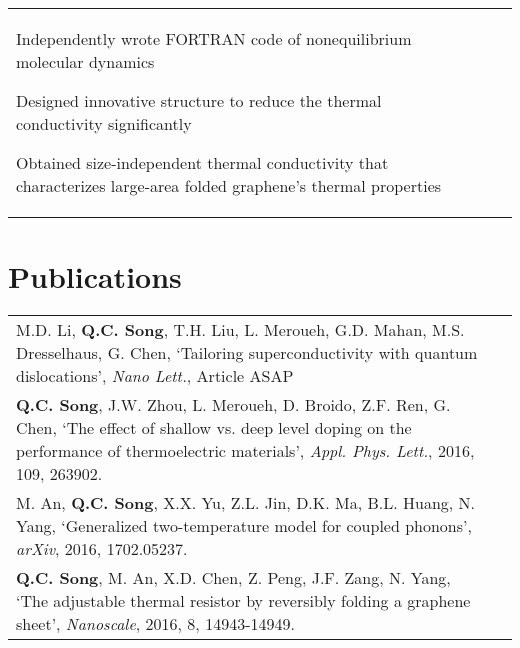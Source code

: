 \documentclass[a4paper,10pt]{article}
\begin{document}
\begin{tabular}{p{13.5cm}p{0.5cm}r}
\begin{compactitem}
       \item Independently wrote FORTRAN code of nonequilibrium molecular dynamics\vspace{0.2em}
       \item Designed innovative structure to reduce the thermal conductivity significantly\vspace{0.2em}
       \item Obtained size-independent thermal conductivity that characterizes large-area folded graphene's thermal properties
     \end{compactitem}&& \vspace{-1.5em} \\

\end{tabular}
\section{Publications}
\begin{tabular}{p{16.5cm}p{0cm}}
M.D. Li, \textbf{Q.C. Song}, T.H. Liu, L. Meroueh, G.D. Mahan, M.S. Dresselhaus, G. Chen, `Tailoring superconductivity with quantum dislocations', \emph{Nano Lett.}, Article ASAP\vspace{0.5em}
\\
\textbf{Q.C. Song}, J.W. Zhou, L. Meroueh, D. Broido, Z.F. Ren, G. Chen, `The effect of shallow vs. deep level doping on the performance of thermoelectric materials', \emph{Appl. Phys. Lett.}, 2016, 109, 263902.\vspace{0.5em}
\\
M. An, \textbf{Q.C. Song}, X.X. Yu, Z.L. Jin, D.K. Ma, B.L. Huang, N. Yang, `Generalized two-temperature model for coupled phonons', \emph{arXiv}, 2016, 1702.05237.\vspace{0.5em}
\\
\textbf{Q.C. Song}, M. An, X.D. Chen, Z. Peng, J.F. Zang, N. Yang, `The adjustable thermal resistor by reversibly folding a graphene sheet', \emph{Nanoscale}, 2016, 8, 14943-14949.&\\
\end{tabular}
\end{document}
